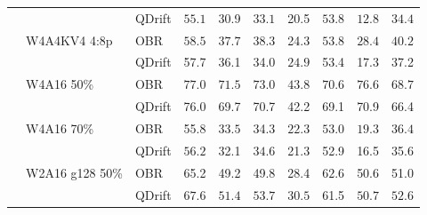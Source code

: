 \begin{tabular}{lllccccccc}
 &  & QDrift & $\mathbf{55.1}$ & 30.9 & $\mathbf{33.1}$ & 20.5 & $\mathbf{53.8}$ & $\mathbf{12.8}$ & $\mathbf{34.4}$ \\
 & W4A4KV4 4:8p & OBR & $\mathbf{58.5}$ & $\mathbf{37.7}$ & $\mathbf{38.3}$ & 24.3 & $\mathbf{53.8}$ & $\mathbf{28.4}$ & $\mathbf{40.2}$ \\
 &  & QDrift & 57.7 & 36.1 & 34.0 & $\mathbf{24.9}$ & 53.4 & 17.3 & 37.2 \\
 & W4A16 50\% & OBR & $\mathbf{77.0}$ & $\mathbf{71.5}$ & $\mathbf{73.0}$ & $\mathbf{43.8}$ & $\mathbf{70.6}$ & $\mathbf{76.6}$ & $\mathbf{68.7}$ \\
 &  & QDrift & 76.0 & 69.7 & 70.7 & 42.2 & 69.1 & 70.9 & 66.4 \\
 & W4A16 70\% & OBR & 55.8 & $\mathbf{33.5}$ & 34.3 & $\mathbf{22.3}$ & $\mathbf{53.0}$ & $\mathbf{19.3}$ & $\mathbf{36.4}$ \\
 &  & QDrift & $\mathbf{56.2}$ & 32.1 & $\mathbf{34.6}$ & 21.3 & 52.9 & 16.5 & 35.6 \\
 & W2A16 g128 50\% & OBR & 65.2 & 49.2 & 49.8 & 28.4 & $\mathbf{62.6}$ & 50.6 & 51.0 \\
 &  & QDrift & $\mathbf{67.6}$ & $\mathbf{51.4}$ & $\mathbf{53.7}$ & $\mathbf{30.5}$ & 61.5 & $\mathbf{50.7}$ & $\mathbf{52.6}$ \\
\bottomrule
\end{tabular}
